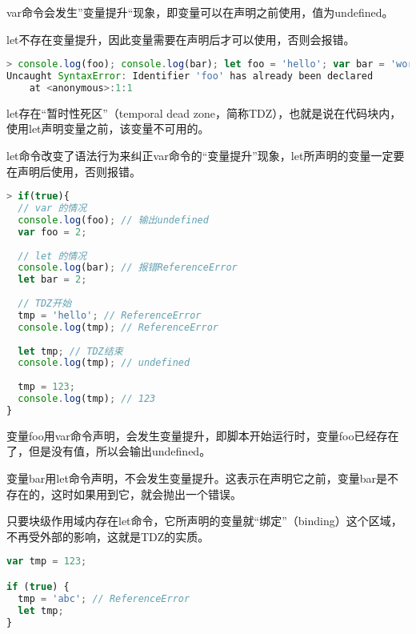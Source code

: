 \begin{compactitem}
\item var命令会发生”变量提升“现象，即变量可以在声明之前使用，值为undefined。
\item let不存在变量提升，因此变量需要在声明后才可以使用，否则会报错。
\end{compactitem}


\begin{lstlisting}[language=JavaScript]
> console.log(foo); console.log(bar); let foo = 'hello'; var bar = 'world';
Uncaught SyntaxError: Identifier 'foo' has already been declared
    at <anonymous>:1:1
\end{lstlisting}

let存在“暂时性死区”（temporal dead zone，简称TDZ），也就是说在代码块内，使用let声明变量之前，该变量不可用的。

let命令改变了语法行为来纠正var命令的“变量提升”现象，let所声明的变量一定要在声明后使用，否则报错。

\begin{lstlisting}[language=JavaScript]
> if(true){
  // var 的情况
  console.log(foo); // 输出undefined
  var foo = 2;
  
  // let 的情况
  console.log(bar); // 报错ReferenceError
  let bar = 2;
  
  // TDZ开始
  tmp = 'hello'; // ReferenceError
  console.log(tmp); // ReferenceError
  
  let tmp; // TDZ结束
  console.log(tmp); // undefined
  
  tmp = 123;
  console.log(tmp); // 123
}
\end{lstlisting}

\begin{compactitem}
\item 变量foo用var命令声明，会发生变量提升，即脚本开始运行时，变量foo已经存在了，但是没有值，所以会输出undefined。
\item 变量bar用let命令声明，不会发生变量提升。这表示在声明它之前，变量bar是不存在的，这时如果用到它，就会抛出一个错误。
\end{compactitem}

只要块级作用域内存在let命令，它所声明的变量就“绑定”（binding）这个区域，不再受外部的影响，这就是TDZ的实质。

\begin{lstlisting}[language=JavaScript]
var tmp = 123;

if (true) {
  tmp = 'abc'; // ReferenceError
  let tmp;
}
\end{lstlisting}

